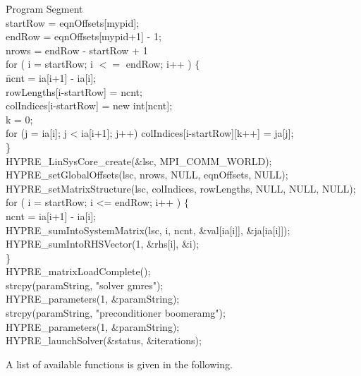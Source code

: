 \begin{tabbing}
\hspace{0.5in} \= {\sf Program Segment} \\[1mm]
\> {\sf startRow = eqnOffsets[mypid];} \\
\> {\sf endRow = eqnOffsets[mypid+1] - 1;} \\
\> {\sf nrows = endRow - startRow + 1} \\
\> {\sf for ( i = startRow; i $<=$ endRow; i++ ) $\{$ } \\
\> \hspace{0.3in} \= {\sf ncnt = ia[i+1] - ia[i];} \\
\> \> {\sf rowLengths[i-startRow] = ncnt;} \\
\> \> {\sf colIndices[i-startRow] = new int[ncnt];} \\
\> \> {\sf k = 0;} \\
\> \> {\sf for (j = ia[i]; j < ia[i+1]; j++) colIndices[i-startRow][k++] = ja[j];}\\
\> \} \\
\> {\sf HYPRE\_LinSysCore\_create(\&lsc, MPI\_COMM\_WORLD);} \\
\> {\sf HYPRE\_setGlobalOffsets(lsc, nrows, NULL, eqnOffsets, NULL);} \\
\> {\sf HYPRE\_setMatrixStructure(lsc, colIndices, rowLengths, NULL, NULL, NULL);} \\
\> {\sf for ( i = startRow; i <= endRow; i++ ) $\{$ } \\
\> \> {\sf ncnt = ia[i+1] - ia[i];} \\
\> \> {\sf HYPRE\_sumIntoSystemMatrix(lsc, i, ncnt, \&val[ia[i]], \&ja[ia[i]]);}\\
\> \> {\sf HYPRE\_sumIntoRHSVector(1, \&rhs[i], \&i);} \\
\> \} \\
\> {\sf HYPRE\_matrixLoadComplete();}\\
\> {\sf strcpy(paramString, "solver gmres");} \\
\> {\sf HYPRE\_parameters(1, \&paramString);} \\
\> {\sf strcpy(paramString, "preconditioner boomeramg");} \\
\> {\sf HYPRE\_parameters(1, \&paramString);} \\
\> {\sf HYPRE\_launchSolver(\&status, \&iterations);}
\end{tabbing}

A list of available functions is given in the following.

